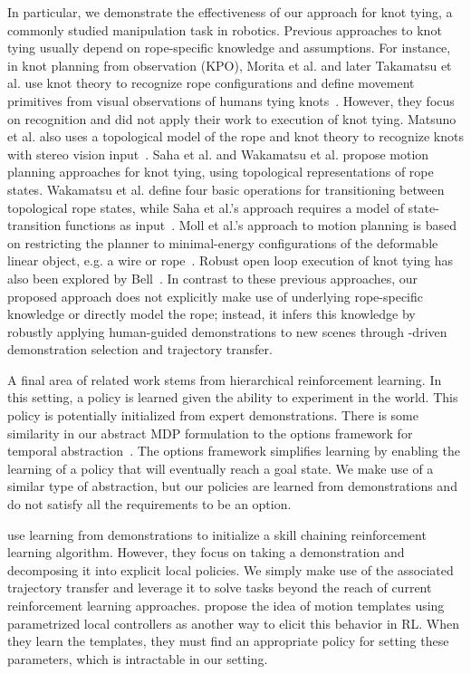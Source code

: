In particular, we demonstrate the effectiveness of our approach for
knot tying, a commonly studied manipulation task in robotics.
Previous approaches to knot tying usually depend on rope-specific knowledge
and assumptions.
For instance, in knot planning from observation (KPO), Morita et al. and later
Takamatsu et al. use knot theory to recognize rope configurations and define
movement primitives from visual observations of humans tying
knots~\cite{Morita_ICRA2003, Takamatsu_TransRob2006}. However, they focus on
recognition and did not apply their work to execution of knot tying. Matsuno et al.
also uses a topological model of the rope and knot theory to recognize knots with
stereo vision input~\cite{Matsuno_RSJ2006}.
Saha et al. and Wakamatsu et al. propose motion planning approaches for knot tying,
using topological representations of rope states. Wakamatsu et al. define four basic operations for
transitioning between topological rope states,
while Saha et al.'s approach requires a model of state-transition functions
as input~\cite{Saha_ExpRobotics2008, Wakamatsu_IJRR2006}. Moll et al.'s approach
to motion planning is based on restricting the planner to minimal-energy
configurations of the deformable linear object, e.g. a wire or rope~\cite{Moll_IEEERobot2006}.
Robust open loop execution of knot tying has also been explored by Bell~\cite{Bell_PhD2010}.
In contrast to these previous approaches, our proposed approach does not
explicitly make use of underlying rope-specific
knowledge or directly model the rope; instead, it infers this knowledge by
robustly applying human-guided demonstrations to new scenes through
\mmql{}-driven demonstration selection and trajectory transfer.



A final area of related work stems from hierarchical reinforcement learning. 
In this setting, a policy is learned given the ability to experiment in the world.
This policy is potentially initialized from expert demonstrations.
There is some similarity in our abstract MDP formulation to the options framework for temporal abstraction~\cite{sutton1999between}.
The options framework simplifies learning by enabling the learning of a policy that will eventually reach a goal state.
We make use of a similar type of abstraction, but our policies are learned from demonstrations and do not satisfy all the requirements to be an option.

\citet{konidaris2010constructing} use learning from demonstrations to initialize a skill chaining reinforcement learning algorithm.
However, they focus on taking a demonstration and decomposing it into explicit local policies.
We simply make use of the associated trajectory transfer and leverage it to solve tasks beyond the reach of current reinforcement learning approaches.
\citet{Neumann09learningcomplex} propose the idea of motion templates using parametrized local controllers as another way to elicit this behavior in RL.
When they learn the templates, they must find an appropriate policy for setting these parameters, which is intractable in our setting.
